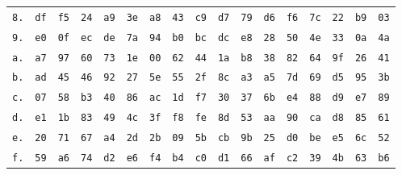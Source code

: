 {\begin{table}[ht!]
\begin{tabular}{r|llllllllllllllll}
      \texttt{8.} & \texttt{df} & \texttt{f5} & \texttt{24} & \texttt{a9} & \texttt{3e} & \texttt{a8} & \texttt{43} & \texttt{c9} & \texttt{d7} & \texttt{79} & \texttt{d6} & \texttt{f6} & \texttt{7c} & \texttt{22} & \texttt{b9} & \texttt{03}\\
      \texttt{9.} & \texttt{e0} & \texttt{0f} & \texttt{ec} & \texttt{de} & \texttt{7a} & \texttt{94} & \texttt{b0} & \texttt{bc} & \texttt{dc} & \texttt{e8} & \texttt{28} & \texttt{50} & \texttt{4e} & \texttt{33} & \texttt{0a} & \texttt{4a}\\
      \texttt{a.} & \texttt{a7} & \texttt{97} & \texttt{60} & \texttt{73} & \texttt{1e} & \texttt{00} & \texttt{62} & \texttt{44} & \texttt{1a} & \texttt{b8} & \texttt{38} & \texttt{82} & \texttt{64} & \texttt{9f} & \texttt{26} & \texttt{41}\\
      \texttt{b.} & \texttt{ad} & \texttt{45} & \texttt{46} & \texttt{92} & \texttt{27} & \texttt{5e} & \texttt{55} & \texttt{2f} & \texttt{8c} & \texttt{a3} & \texttt{a5} & \texttt{7d} & \texttt{69} & \texttt{d5} & \texttt{95} & \texttt{3b}\\
      \texttt{c.} & \texttt{07} & \texttt{58} & \texttt{b3} & \texttt{40} & \texttt{86} & \texttt{ac} & \texttt{1d} & \texttt{f7} & \texttt{30} & \texttt{37} & \texttt{6b} & \texttt{e4} & \texttt{88} & \texttt{d9} & \texttt{e7} & \texttt{89}\\
      \texttt{d.} & \texttt{e1} & \texttt{1b} & \texttt{83} & \texttt{49} & \texttt{4c} & \texttt{3f} & \texttt{f8} & \texttt{fe} & \texttt{8d} & \texttt{53} & \texttt{aa} & \texttt{90} & \texttt{ca} & \texttt{d8} & \texttt{85} & \texttt{61}\\
      \texttt{e.} & \texttt{20} & \texttt{71} & \texttt{67} & \texttt{a4} & \texttt{2d} & \texttt{2b} & \texttt{09} & \texttt{5b} & \texttt{cb} & \texttt{9b} & \texttt{25} & \texttt{d0} & \texttt{be} & \texttt{e5} & \texttt{6c} & \texttt{52}\\
      \texttt{f.} & \texttt{59} & \texttt{a6} & \texttt{74} & \texttt{d2} & \texttt{e6} & \texttt{f4} & \texttt{b4} & \texttt{c0} & \texttt{d1} & \texttt{66} & \texttt{af} & \texttt{c2} & \texttt{39} & \texttt{4b} & \texttt{63} & \texttt{b6}\\
    \end{tabular}
  \end{table}
}